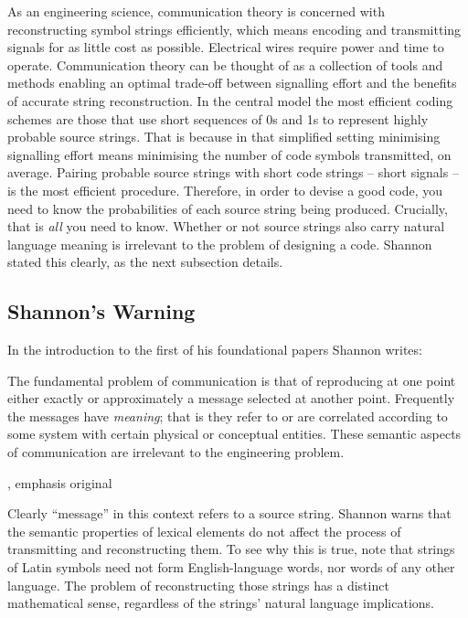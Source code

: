 \documentclass[12pt]{article}
\begin{document}
As an engineering science, communication theory is concerned with reconstructing symbol strings efficiently, which means encoding and transmitting signals for as little cost as possible.
Electrical wires require power and time to operate.
Communication theory can be thought of as a collection of tools and methods enabling an optimal trade-off between signalling effort and the benefits of accurate string reconstruction.
In the central model the most efficient coding schemes are those that use short sequences of 0s and 1s to represent highly probable source strings.
That is because in that simplified setting minimising signalling effort means minimising the number of code symbols transmitted, on average.
Pairing probable source strings with short code strings -- short signals -- is the most efficient procedure.
Therefore, in order to devise a good code, you need to know the probabilities of each source string being produced.
Crucially, that is \textit{all} you need to know.
Whether or not source strings also carry natural language meaning is irrelevant to the problem of designing a code.
Shannon stated this clearly, as the next subsection details.


\subsection{Shannon's Warning}\label{subsec:warning}

In the introduction to the first of his foundational papers Shannon writes:

\begin{myquote}
The fundamental problem of communication is that of reproducing at one point either exactly or approximately a message selected at another point. Frequently the messages have \emph{meaning}; that is they refer to or are correlated according to some system with certain physical or conceptual entities. These semantic aspects of communication are irrelevant to the engineering problem.
\par\hspace*{\fill}\citet[379]{shannon1948mathematicalc}, emphasis original
\end{myquote}

\noindent Clearly ``message'' in this context refers to a source string.
Shannon warns that the semantic properties of lexical elements do not affect the process of transmitting and reconstructing them.
To see why this is true, note that strings of Latin symbols need not form English-language words, nor words of any other language.
The problem of reconstructing those strings has a distinct mathematical sense, regardless of the strings' natural language implications.
\end{document}
